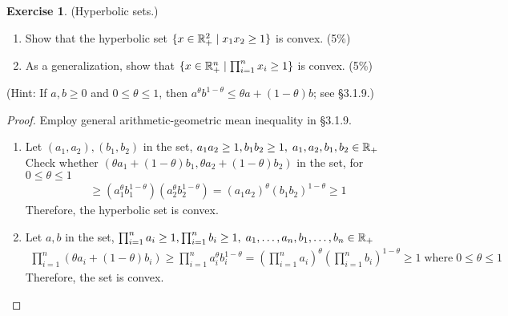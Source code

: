 \documentclass[12pt]{extarticle}
\theoremstyle{definition}
\newtheorem{exercise}{Exercise}
\begin{document}
\begin{exercise}
  (Hyperbolic sets.)
  \begin{enumerate}[label=(\alph*)]
    \item Show that the hyperbolic set $\{x\in\mathbb{R}_{+}^2\mid x_1x_2\ge 1\}$ is convex. (5\%)
    \item As a generalization, show that $\{x\in\mathbb{R}_+^n\mid\prod_{i=1}^n x_i\ge 1\}$ is convex. (5\%)
  \end{enumerate}
  (Hint: If $a,b\ge 0$ and $0\le\theta\le 1$, then $a^\theta b^{1-\theta}\le\theta a+(1-\theta)b$; see \S 3.1.9.)
\end{exercise}
\begin{proof}
  Employ general arithmetic-geometric mean inequality in \S 3.1.9.
  \begin{enumerate}[label=(\alph*)]
    \item Let $(a_1, a_2), (b_1, b_2)$ in the set, \ie $a_1a_2\ge 1, b_1b_2\ge 1,\;a_1, a_2, b_1, b_2\in\mathbb{R}_{+}$\\
          Check whether $(\theta a_1+(1-\theta)b_1, \theta a_2+(1-\theta)b_2)$ in the set, for $0\le\theta\le 1$
          \begin{align*}
            [\theta a_1+(1-\theta)b_1][\theta a_2+(1-\theta)b_2]
                \ge (a_1^\theta b_1^{1-\theta})(a_2^\theta b_2^{1-\theta})
                = (a_1a_2)^\theta(b_1b_2)^{1-\theta} \ge 1
          \end{align*}
          Therefore, the hyperbolic set is convex.
    \item Let $a, b$ in the set, \ie $\prod_{i=1}^na_i\ge 1, \prod_{i=1}^nb_i\ge 1,\;a_1,\dots,a_n,b_1,\dots,b_n\in\mathbb{R}_{+}$
          \begin{align*}
            \prod_{i=1}^n(\theta a_i+(1-\theta)b_i)\ge \prod_{i=1}^n a_i^\theta b_i^{1-\theta}=(\prod_{i=1}^n a_i)^\theta(\prod_{i=1}^n b_i)^{1-\theta}\ge 1\;\text{where}\;0\le\theta\le 1
          \end{align*}
          Therefore, the set is convex.\qedhere
  \end{enumerate}
\end{proof}
\end{document}
